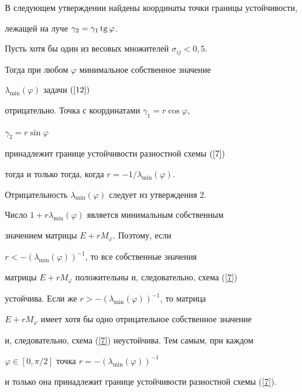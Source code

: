 В следующем утверждении найдены координаты точки границы устойчивости,


лежащей на луче $\gamma_2=\gamma_1\operatorname{tg} \varphi$.





\begin{assrt}


Пусть хотя бы один из весовых множителей $\sigma_{ij}< 0,5$.


Тогда при любом $\varphi$ минимальное собственное значение


$\lambda_{\min}(\varphi)$ задачи $(\ref{12})$


отрицательно. Точка с координатами $\gamma_{1}=r\cos\varphi$,


$\gamma_{2}=r\sin\varphi$


принадлежит границе устойчивости разностной схемы $(\ref{7})$


тогда и только тогда, когда $r=-1/\lambda_{\min}(\varphi)$.


\end{assrt}





\begin{pf}


Отрицательность $\lambda_{\min}(\varphi)$ следует из утверждения 2. 


Число $1+r\lambda_{\min}(\varphi)$ является минимальным собственным 


значением матрицы $E+rM_{\varphi}$. Поэтому, если


$r{<}{-}(\lambda_{\min}(\varphi))^{-1}$, то все собственные значения 


матрицы $E+rM_{\varphi}$ положительны и, следовательно, схема (\ref{7}) 


устойчива. Если же $r > - (\lambda_{\min}(\varphi))^{-1}$, то матрица


$E+rM_{\varphi}$ имеет хотя бы одно отрицательное собственное значение


и, следовательно, схема (\ref{7}) неустойчива. Тем самым, при каждом


$\varphi\in [0,\pi /2 ]$ точка $r = - (\lambda_{\min}(\varphi))^{-1}$


и только она принадлежит границе устойчивости разностной схемы (\ref{7}).


\end{pf}





